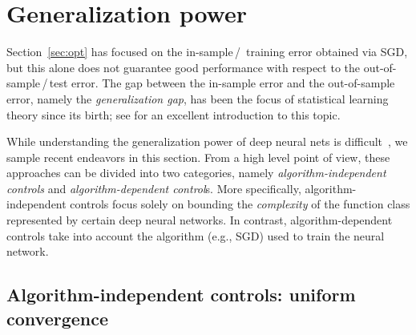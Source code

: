 
\section{Generalization power}\label{sec:generalization}

Section~\ref{sec:opt} has focused on the in-sample$\,$/$\,$ training
error obtained via SGD, but this alone does not guarantee good performance with respect to the
out-of-sample$\,$/$\,$test error. The gap between the in-sample
error and the out-of-sample error, namely the \emph{generalization
gap}, has been the focus of statistical learning theory since its
birth; see \cite{shalev2014understanding} for an excellent introduction
to this topic.


While understanding the generalization power of deep neural nets is difficult~\cite{zhang2016understanding,recht2018cifar}, we sample recent endeavors in this section. From a high level point of
view, these approaches can be divided into two categories, namely \emph{algorithm-independent controls }and \emph{algorithm-dependent
control}s. More specifically, algorithm-independent controls focus
solely on bounding the \emph{complexity }of the function class represented
by certain deep neural networks. In contrast, algorithm-dependent
controls take into account the algorithm (e.g., SGD) used
to train the neural network.


\subsection{Algorithm-independent controls: uniform convergence}

